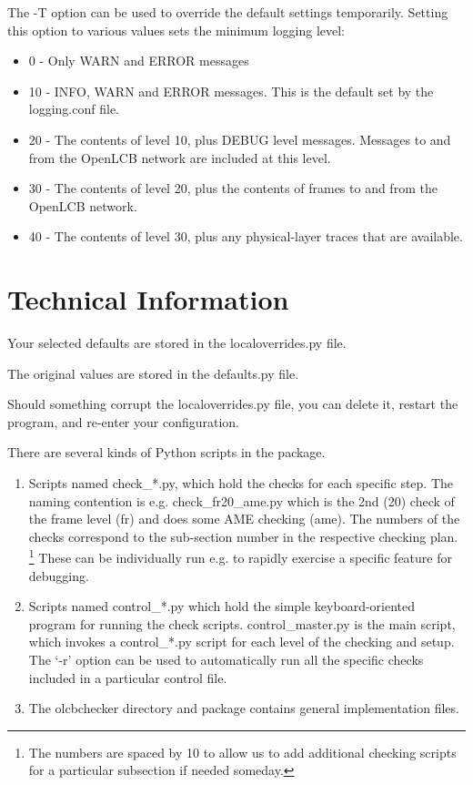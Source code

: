 The -T option can be used to override the default settings temporarily.  
Setting this option to various values sets the minimum logging level:
\begin{itemize}
\item 0 - Only WARN and ERROR messages
\item 10 -  INFO, WARN and ERROR messages.  This is the default set by the logging.conf file.
\item 20 - The contents of level 10, plus DEBUG level messages. 
        Messages to and from the OpenLCB network are included at this level.
\item 30 - The contents of level 20, plus the contents of frames to and from the 
        OpenLCB network.
\item 40 - The contents of level 30, plus any physical-layer traces that are available.
\end{itemize}

\section{Technical Information}

Your selected defaults are stored in the localoverrides.py file.

The original values are stored in the defaults.py file.

Should something corrupt the localoverrides.py file,
you can delete it, restart the program, and re-enter your configuration.

There are several kinds of Python scripts in the package.
\begin{enumerate}
\item Scripts named check\_*.py, which hold the checks for each specific step.
    The naming contention is e.g. check\_fr20\_ame.py which is the 2nd (20)
    check of the frame level (fr) and does some AME checking (ame).
    The numbers of the checks correspond to the sub-section number in the 
    respective checking plan.
    \footnote{The numbers are spaced by 10 to allow us to add additional
        checking scripts for a particular subsection if needed someday.}
    These can be individually run e.g. to rapidly exercise a specific feature for debugging.
\item Scripts named control\_*.py which hold the simple keyboard-oriented
    program for running the check scripts.  control\_master.py is the
    main script, which invokes a control\_*.py script for each level of the
    checking and setup. The `-r' option can be used to automatically
    run all the specific checks included in a particular control file.
\item The olcbchecker directory and package contains general implementation
    files.
\end{enumerate}




